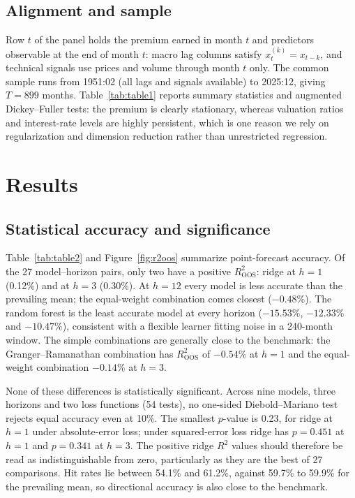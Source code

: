 \documentclass[11pt,a4paper]{article}
\begin{document}
\subsection{Alignment and sample}\label{sec:data:align}
Row $t$ of the panel holds the premium earned in month $t$ and predictors
observable at the end of month $t$: macro lag columns satisfy
$x^{(k)}_t = x_{t-k}$, and technical signals use prices and volume through
month $t$ only. The common sample runs from 1951:02 (all lags and signals
available) to 2025:12, giving $T=899$ months. Table~\ref{tab:table1}
reports summary statistics and augmented Dickey--Fuller tests: the premium
is clearly stationary, whereas valuation ratios and interest-rate levels are
highly persistent, which is one reason we rely on regularization and
dimension reduction rather than unrestricted regression.



\section{Results}\label{sec:results}

\subsection{Statistical accuracy and significance}\label{sec:results:accuracy}
Table~\ref{tab:table2} and Figure~\ref{fig:r2oos} summarize point-forecast
accuracy. Of the 27 model--horizon pairs, only two have a positive
$R^2_{\mathrm{OOS}}$: ridge at $h=1$ (0.12\%) and at $h=3$ (0.30\%). At
$h=12$ every model is less accurate than the prevailing mean; the
equal-weight combination comes closest ($-0.48\%$). The random forest is the
least accurate model at every horizon ($-15.53\%$, $-12.33\%$ and
$-10.47\%$), consistent with a flexible learner fitting noise in a
240-month window. The simple combinations are generally close to the
benchmark: the Granger--Ramanathan combination has $R^2_{\mathrm{OOS}}$ of
$-0.54\%$ at $h=1$ and the equal-weight combination $-0.14\%$ at $h=3$.

None of these differences is statistically significant. Across nine models,
three horizons and two loss functions (54 tests), no one-sided
Diebold--Mariano test rejects equal accuracy even at 10\%. The smallest
$p$-value is 0.23, for ridge at $h=1$ under absolute-error loss; under
squared-error loss ridge has $p=0.451$ at $h=1$ and $p=0.341$ at $h=3$. The
positive ridge $R^2$ values should therefore be read as indistinguishable
from zero, particularly as they are the best of 27 comparisons. Hit rates
lie between 54.1\% and 61.2\%, against 59.7\% to 59.9\% for the prevailing
mean, so directional accuracy is also close to the benchmark.
\end{document}
